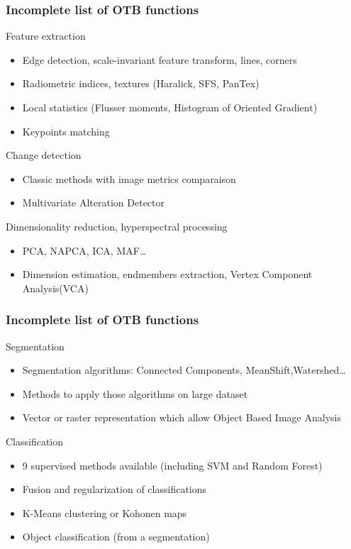 \documentclass[8pt]{beamer}
\begin{document}
\begin{frame}
\frametitle{Incomplete list of OTB functions}

\begin{block}{Feature extraction}
\begin{itemize}
\item Edge detection, scale-invariant feature transform, lines, corners
\item Radiometric indices, textures (Haralick, SFS, PanTex)
\item Local statistics (Flusser moments, Histogram of Oriented Gradient)
\item Keypoints matching
\end{itemize}
\end{block}

\begin{block}{Change detection}
\begin{itemize}
\item Classic methods with image metrics comparaison
\item Multivariate Alteration Detector
\end{itemize}
\end{block}

\begin{block}{Dimensionality reduction, hyperspectral processing}
\begin{itemize}
\item PCA, NAPCA, ICA, MAF\ldots
\item Dimension estimation, endmembers extraction, Vertex Component Analysis(VCA)
\end{itemize}
\end{block}

\end{frame}

\begin{frame}
\frametitle{Incomplete list of OTB functions}
\begin{block}{Segmentation}
\begin{itemize}
\item Segmentation algorithms: Connected Components, MeanShift,Watershed\ldots
\item Methods to apply those algorithms on large dataset
\item Vector or raster representation which allow Object Based Image Analysis
\end{itemize}
\end{block}

\begin{block}{Classification}
\begin{itemize}
\item 9 supervised methods available (including SVM and Random Forest)
\item Fusion and regularization of classifications
\item K-Means clustering or Kohonen maps
\item Object classification (from a segmentation)
\end{itemize}
\end{block}

\end{frame}
\end{document}
